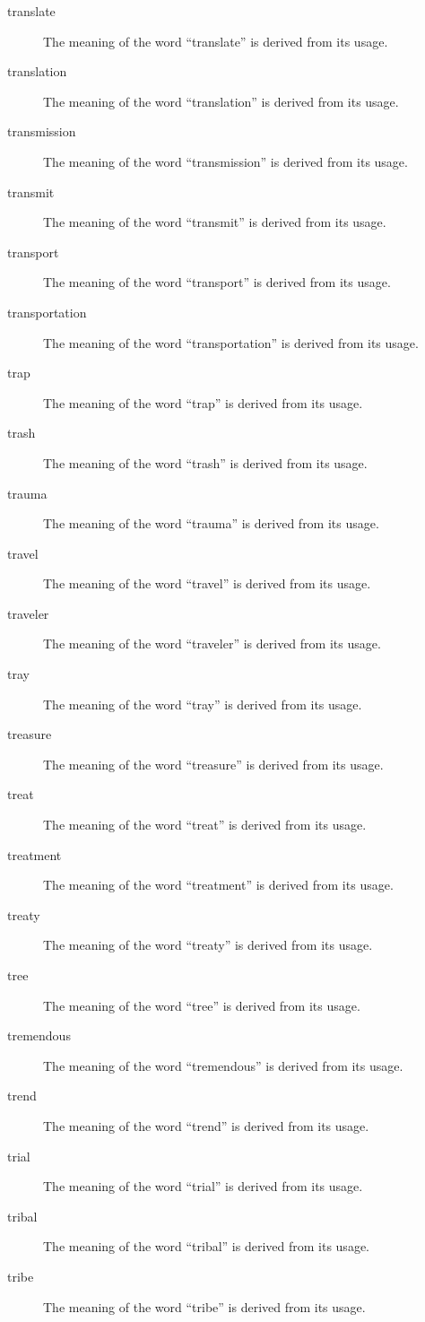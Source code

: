 \documentclass[12pt, letterpaper]{memoir}
\begin{document}
\begin{description}
\item[translate] The meaning of the word ``translate'' is derived from its usage.
\item[translation] The meaning of the word ``translation'' is derived from its usage.
\item[transmission] The meaning of the word ``transmission'' is derived from its usage.
\item[transmit] The meaning of the word ``transmit'' is derived from its usage.
\item[transport] The meaning of the word ``transport'' is derived from its usage.
\item[transportation] The meaning of the word ``transportation'' is derived from its usage.
\item[trap] The meaning of the word ``trap'' is derived from its usage.
\item[trash] The meaning of the word ``trash'' is derived from its usage.
\item[trauma] The meaning of the word ``trauma'' is derived from its usage.
\item[travel] The meaning of the word ``travel'' is derived from its usage.
\item[traveler] The meaning of the word ``traveler'' is derived from its usage.
\item[tray] The meaning of the word ``tray'' is derived from its usage.
\item[treasure] The meaning of the word ``treasure'' is derived from its usage.
\item[treat] The meaning of the word ``treat'' is derived from its usage.
\item[treatment] The meaning of the word ``treatment'' is derived from its usage.
\item[treaty] The meaning of the word ``treaty'' is derived from its usage.
\item[tree] The meaning of the word ``tree'' is derived from its usage.
\item[tremendous] The meaning of the word ``tremendous'' is derived from its usage.
\item[trend] The meaning of the word ``trend'' is derived from its usage.
\item[trial] The meaning of the word ``trial'' is derived from its usage.
\item[tribal] The meaning of the word ``tribal'' is derived from its usage.
\item[tribe] The meaning of the word ``tribe'' is derived from its usage.

\end{description}
\end{document}
